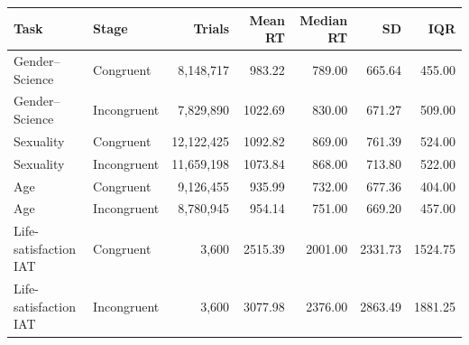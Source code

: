 \begin{tabular}{@{}llrrrrr@{}}
\toprule
Task & Stage & Trials & Mean RT & Median RT & SD & IQR \\
\midrule
Gender--Science & Congruent & 8,148,717 & 983.22 & 789.00 & 665.64 & 455.00 \\
Gender--Science & Incongruent & 7,829,890 & 1022.69 & 830.00 & 671.27 & 509.00 \\
Sexuality & Congruent & 12,122,425 & 1092.82 & 869.00 & 761.39 & 524.00 \\
Sexuality & Incongruent & 11,659,198 & 1073.84 & 868.00 & 713.80 & 522.00 \\
Age & Congruent & 9,126,455 & 935.99 & 732.00 & 677.36 & 404.00 \\
Age & Incongruent & 8,780,945 & 954.14 & 751.00 & 669.20 & 457.00 \\
Life-satisfaction IAT & Congruent & 3,600 & 2515.39 & 2001.00 & 2331.73 & 1524.75 \\
Life-satisfaction IAT & Incongruent & 3,600 & 3077.98 & 2376.00 & 2863.49 & 1881.25 \\
\bottomrule
\end{tabular}
